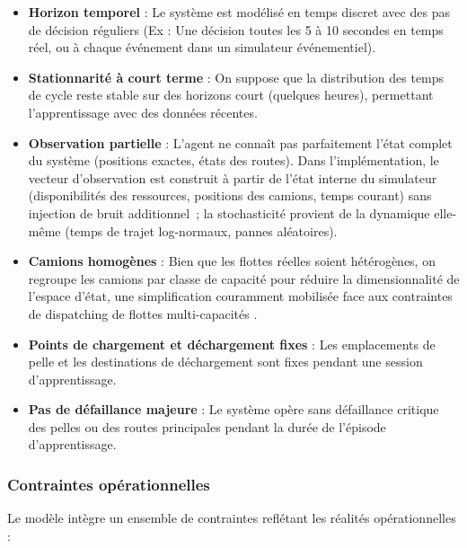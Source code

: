 \documentclass[11pt,a4paper]{report}
\begin{document}
\begin{itemize}
    \item \textbf{Horizon temporel} : Le système est modélisé en temps discret avec des pas de décision réguliers (Ex : Une décision toutes les 5 à 10 secondes en temps réel, ou à chaque événement dans un simulateur événementiel).
    
    \item \textbf{Stationnarité à court terme} : On suppose que la distribution des temps de cycle reste stable sur des horizons court (quelques heures), permettant l'apprentissage avec des données récentes.
    
    \item \textbf{Observation partielle} : L'agent ne connaît pas parfaitement l'état complet du système (positions exactes, états des routes). Dans l'implémentation, le vecteur d'observation est construit à partir de l'état interne du simulateur (disponibilités des ressources, positions des camions, temps courant) sans injection de bruit additionnel~; la stochasticité provient de la dynamique elle-même (temps de trajet log-normaux, pannes aléatoires).
    
    \item \textbf{Camions homogènes} : Bien que les flottes réelles soient hétérogènes, on regroupe les camions par classe de capacité pour réduire la dimensionnalité de l'espace d'état, une simplification couramment mobilisée face aux contraintes de dispatching de flottes multi-capacités \cite{Ahangaran2012}.
    
    \item \textbf{Points de chargement et déchargement fixes} : Les emplacements de pelle et les destinations de déchargement sont fixes pendant une session d'apprentissage.
    
    \item \textbf{Pas de défaillance majeure} : Le système opère sans défaillance critique des pelles ou des routes principales pendant la durée de l'épisode d'apprentissage.
\end{itemize}

\subsubsection*{Contraintes opérationnelles}

Le modèle intègre un ensemble de contraintes reflétant les réalités opérationnelles :
\end{document}
